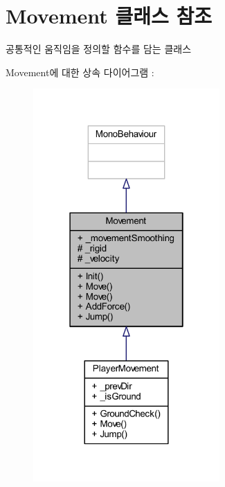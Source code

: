 \hypertarget{class_movement}{}\section{Movement 클래스 참조}
\label{class_movement}


공통적인 움직임을 정의할 함수를 담는 클래스  




Movement에 대한 상속 다이어그램 \+: 
\nopagebreak
\begin{figure}[H]
\begin{center}
\leavevmode
\includegraphics[width=202pt]{d8/d54/class_movement__inherit__graph}
\end{center}
\end{figure}


